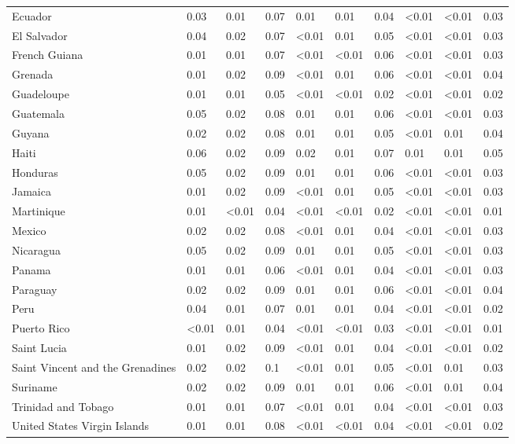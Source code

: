 \begin{longtable}[t]{llllllllll}
Ecuador & 0.03 & 0.01 & 0.07 & 0.01 & 0.01 & 0.04 & <0.01 & <0.01 & 0.03\\
El Salvador & 0.04 & 0.02 & 0.07 & <0.01 & 0.01 & 0.05 & <0.01 & <0.01 & 0.03\\
French Guiana & 0.01 & 0.01 & 0.07 & <0.01 & <0.01 & 0.06 & <0.01 & <0.01 & 0.03\\
Grenada & 0.01 & 0.02 & 0.09 & <0.01 & 0.01 & 0.06 & <0.01 & <0.01 & 0.04\\
\addlinespace
Guadeloupe & 0.01 & 0.01 & 0.05 & <0.01 & <0.01 & 0.02 & <0.01 & <0.01 & 0.02\\
Guatemala & 0.05 & 0.02 & 0.08 & 0.01 & 0.01 & 0.06 & <0.01 & <0.01 & 0.03\\
Guyana & 0.02 & 0.02 & 0.08 & 0.01 & 0.01 & 0.05 & <0.01 & 0.01 & 0.04\\
Haiti & 0.06 & 0.02 & 0.09 & 0.02 & 0.01 & 0.07 & 0.01 & 0.01 & 0.05\\
Honduras & 0.05 & 0.02 & 0.09 & 0.01 & 0.01 & 0.06 & <0.01 & <0.01 & 0.03\\
\addlinespace
Jamaica & 0.01 & 0.02 & 0.09 & <0.01 & 0.01 & 0.05 & <0.01 & <0.01 & 0.03\\
Martinique & 0.01 & <0.01 & 0.04 & <0.01 & <0.01 & 0.02 & <0.01 & <0.01 & 0.01\\
Mexico & 0.02 & 0.02 & 0.08 & <0.01 & 0.01 & 0.04 & <0.01 & <0.01 & 0.03\\
Nicaragua & 0.05 & 0.02 & 0.09 & 0.01 & 0.01 & 0.05 & <0.01 & <0.01 & 0.03\\
Panama & 0.01 & 0.01 & 0.06 & <0.01 & 0.01 & 0.04 & <0.01 & <0.01 & 0.03\\
\addlinespace
Paraguay & 0.02 & 0.02 & 0.09 & 0.01 & 0.01 & 0.06 & <0.01 & <0.01 & 0.04\\
Peru & 0.04 & 0.01 & 0.07 & 0.01 & 0.01 & 0.04 & <0.01 & <0.01 & 0.02\\
Puerto Rico & <0.01 & 0.01 & 0.04 & <0.01 & <0.01 & 0.03 & <0.01 & <0.01 & 0.01\\
Saint Lucia & 0.01 & 0.02 & 0.09 & <0.01 & 0.01 & 0.04 & <0.01 & <0.01 & 0.02\\
Saint Vincent and the Grenadines & 0.02 & 0.02 & 0.1 & <0.01 & 0.01 & 0.05 & <0.01 & 0.01 & 0.03\\
\addlinespace
Suriname & 0.02 & 0.02 & 0.09 & 0.01 & 0.01 & 0.06 & <0.01 & 0.01 & 0.04\\
Trinidad and Tobago & 0.01 & 0.01 & 0.07 & <0.01 & 0.01 & 0.04 & <0.01 & <0.01 & 0.03\\
United States Virgin Islands & 0.01 & 0.01 & 0.08 & <0.01 & <0.01 & 0.04 & <0.01 & <0.01 & 0.02\\

\end{longtable}
